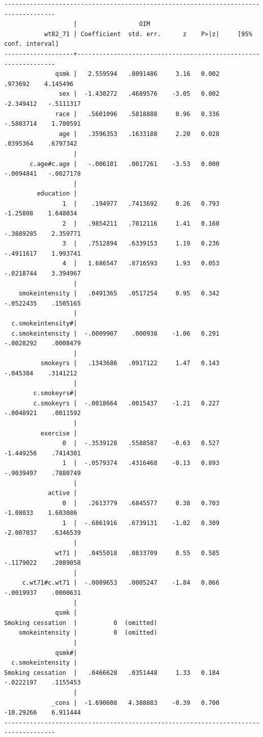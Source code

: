 \documentclass[
  10pt,
  a4paper,
]{book}
\begin{document}
\begin{verbatim}
------------------------------------------------------------------------------------
                   |                 OIM
           wt82_71 | Coefficient  std. err.      z    P>|z|     [95% conf. interval]
-------------------+----------------------------------------------------------------
              qsmk |   2.559594   .8091486     3.16   0.002      .973692    4.145496
               sex |  -1.430272   .4689576    -3.05   0.002    -2.349412   -.5111317
              race |   .5601096   .5818888     0.96   0.336    -.5803714    1.700591
               age |   .3596353   .1633188     2.20   0.028     .0395364    .6797342
                   |
       c.age#c.age |   -.006101   .0017261    -3.53   0.000    -.0094841   -.0027178
                   |
         education |
                1  |    .194977   .7413692     0.26   0.793     -1.25808    1.648034
                2  |   .9854211   .7012116     1.41   0.160    -.3889285    2.359771
                3  |   .7512894   .6339153     1.19   0.236    -.4911617    1.993741
                4  |   1.686547   .8716593     1.93   0.053    -.0218744    3.394967
                   |
    smokeintensity |   .0491365   .0517254     0.95   0.342    -.0522435    .1505165
                   |
  c.smokeintensity#|
  c.smokeintensity |  -.0009907    .000938    -1.06   0.291    -.0028292    .0008479
                   |
          smokeyrs |   .1343686   .0917122     1.47   0.143     -.045384    .3141212
                   |
        c.smokeyrs#|
        c.smokeyrs |  -.0018664   .0015437    -1.21   0.227    -.0048921    .0011592
                   |
          exercise |
                0  |  -.3539128   .5588587    -0.63   0.527    -1.449256    .7414301
                1  |  -.0579374   .4316468    -0.13   0.893    -.9039497    .7880749
                   |
            active |
                0  |   .2613779   .6845577     0.38   0.703     -1.08033    1.603086
                1  |  -.6861916   .6739131    -1.02   0.309    -2.007037    .6346539
                   |
              wt71 |   .0455018   .0833709     0.55   0.585    -.1179022    .2089058
                   |
     c.wt71#c.wt71 |  -.0009653   .0005247    -1.84   0.066    -.0019937    .0000631
                   |
              qsmk |
Smoking cessation  |          0  (omitted)
    smokeintensity |          0  (omitted)
                   |
              qsmk#|
  c.smokeintensity |
Smoking cessation  |   .0466628   .0351448     1.33   0.184    -.0222197    .1155453
                   |
             _cons |  -1.690608   4.388883    -0.39   0.700    -10.29266    6.911444
------------------------------------------------------------------------------------


\end{verbatim}
\end{document}
